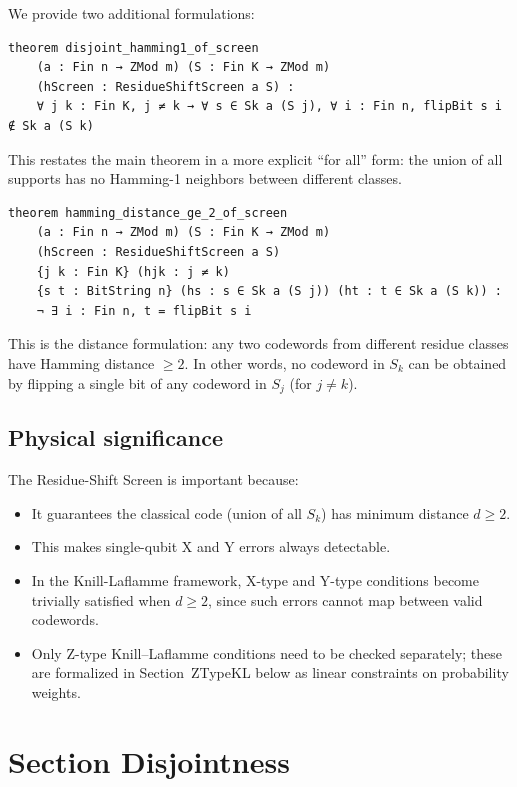 \documentclass[11pt]{article}
\begin{document}
We provide two additional formulations:

\begin{lstlisting}
theorem disjoint_hamming1_of_screen
    (a : Fin n → ZMod m) (S : Fin K → ZMod m)
    (hScreen : ResidueShiftScreen a S) :
    ∀ j k : Fin K, j ≠ k → ∀ s ∈ Sk a (S j), ∀ i : Fin n, flipBit s i ∉ Sk a (S k)
\end{lstlisting}

This restates the main theorem in a more explicit ``for all'' form:
the union of all supports has no Hamming-1 neighbors between different classes.

\begin{lstlisting}
theorem hamming_distance_ge_2_of_screen
    (a : Fin n → ZMod m) (S : Fin K → ZMod m)
    (hScreen : ResidueShiftScreen a S)
    {j k : Fin K} (hjk : j ≠ k)
    {s t : BitString n} (hs : s ∈ Sk a (S j)) (ht : t ∈ Sk a (S k)) :
    ¬ ∃ i : Fin n, t = flipBit s i
\end{lstlisting}

This is the distance formulation: any two codewords from different residue classes have Hamming distance $\geq 2$.
In other words, no codeword in $S_k$ can be obtained by flipping a single bit of any codeword in $S_j$ (for $j \neq k$).

\subsection*{Physical significance}

The Residue-Shift Screen is important because:
\begin{itemize}
\item It guarantees the classical code (union of all $S_k$) has minimum distance $d \geq 2$.
\item This makes single-qubit X and Y errors always detectable.
\item In the Knill-Laflamme framework, X-type and Y-type conditions become trivially satisfied when $d \geq 2$, since such errors cannot map between valid codewords.
\item Only Z-type Knill--Laflamme conditions need to be checked separately; these are formalized in Section~ZTypeKL below as linear constraints on probability weights.
\end{itemize}

\section*{Section Disjointness}
\end{document}
